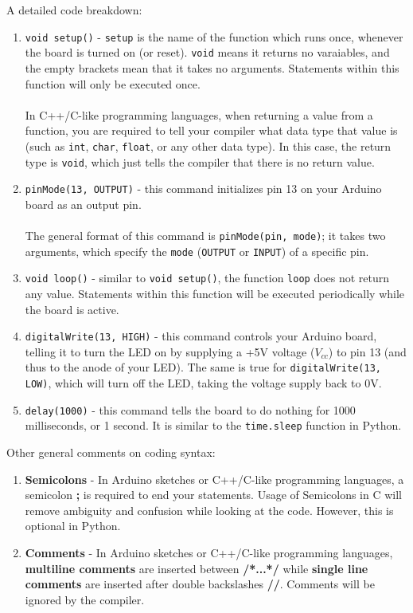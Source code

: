 \documentclass{article}
\begin{document}
\begin{tcolorbox}[breakable]
\noindent A detailed code breakdown: 
\begin{enumerate}
    \item \texttt{void setup()} - \texttt{setup} is the name of the function which runs once, whenever the board is turned on (or reset). \texttt{void} means it returns no varaiables, and the empty brackets mean that it takes no arguments. Statements within this function will only be executed once.\\\\ In C++/C-like programming languages, when returning a value from a function, you are required to tell your compiler what data type that value is (such as \texttt{int}, \texttt{char}, \texttt{float}, or any other data type). In this case, the return type is \texttt{void}, which just tells the compiler that there is no return value.
    
    \item \texttt{pinMode(13, OUTPUT)} - this command initializes pin 13 on your Arduino board as an output pin. \\\\The general format of this command is \texttt{pinMode(pin, mode)}; it takes two arguments, which specify the \texttt{mode} (\texttt{OUTPUT} or \texttt{INPUT}) of a specific pin.
    
    \item \texttt{void loop()} - similar to \texttt{void setup()}, the function \texttt{loop} does not return any value. Statements within this function will be executed periodically while the board is active.
    
    \item \texttt{digitalWrite(13, HIGH)} - this command controls your Arduino board, telling it to turn the LED on by supplying a +5V voltage ($V_{cc}$) to pin 13 (and thus to the anode of your LED). The same is true for \texttt{digitalWrite(13, LOW)}, which will turn off the LED, taking the voltage supply back to 0V.
    
    \item \texttt{delay(1000)} - this command tells the board to do nothing for 1000 milliseconds, or 1 second. It is similar to the \texttt{time.sleep} function in Python.
\end{enumerate}
Other general comments on coding syntax:
\begin{enumerate}[resume]
    \item \textbf{Semicolons} - In Arduino sketches or C++/C-like programming languages, a semicolon \textbf{\large ;} is required to end your statements. Usage of Semicolons in C will remove ambiguity and confusion while looking at the code. However, this is optional in Python.
    
    \item \textbf{Comments} - In Arduino sketches or C++/C-like programming languages, \textbf{multiline comments} are inserted between \textbf{\large /*...*/} while \textbf{single line comments} are inserted after double backslashes \textbf{\large //}. Comments will be ignored by the compiler. 
\end{enumerate}
\end{tcolorbox}
\end{document}

